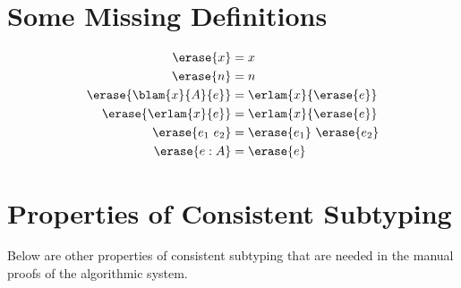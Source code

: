 
\section{Some Missing Definitions}

\begin{definition}
  \begin{align*}
    \erase{x} &= x \\
    \erase{n} &= n \\
    \erase{\blam{x}{A}{e}} &= \erlam{x}{\erase{e}} \\
    \erase{\erlam{x}{e}} &= \erlam{x}{\erase{e}} \\
    \erase{e_1 ~ e_2} &= \erase{e_1} ~ \erase{e_2} \\
    \erase{e : A } &= \erase{e}
  \end{align*}
\end{definition}


\begin{definition}
  \label{fig:lessp}
\end{definition}



\section{Properties of Consistent Subtyping}

Below are other properties of consistent subtyping that are needed in the manual
proofs of the algorithmic system.

